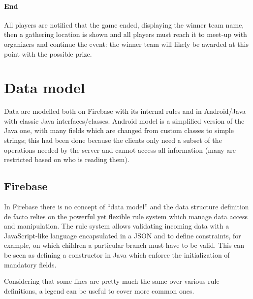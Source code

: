 		\paragraph{End}
		
			All players are notified that the game ended, displaying the winner team name, then a gathering location is shown and all players must reach it to meet-up with organizers and continue the event: the winner team will likely be awarded at this point with the possible prize.
			
	\section{Data model}	
		
		Data are modelled both on Firebase with its internal rules and in Android/Java with classic Java interfaces/classes.
		Android model is a simplified version of the Java one, with many fields which are changed from custom classes to simple strings; this had been done because the clients only need a subset of the operations needed by the server and cannot access all information (many are restricted based on who is reading them).
		
		\subsection{Firebase}
			
			In Firebase there is no concept of “data model” and the data structure definition de facto relies on the powerful yet flexible rule system which manage data access and manipulation.
			The rule system allows validating incoming data with a JavaScript-like language encapsulated in a JSON and to define constraints, for example, on which children a particular branch must have to be valid. This can be seen as defining a constructor in Java which enforce the initialization of mandatory fields.
			
			Considering that some lines are pretty much the same over various rule definitions, a legend can be useful to cover more common ones.
			
